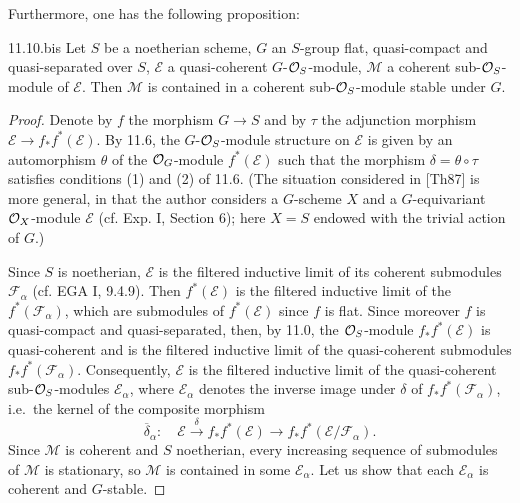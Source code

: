 Furthermore, one has the following proposition:
\begin{proposition}{11.10.bis}\label{VIB.11.10.bis}
Let $S$ be a noetherian scheme, $G$ an $S$-group flat, quasi-compact and quasi-separated over $S$, $\mathscr E$ a quasi-coherent $G$-$\mathcal{O}_S$-module, $\mathscr M$ a coherent sub-$\mathcal{O}_S$-module of $\mathscr E$. Then $\mathscr M$ is contained in a coherent sub-$\mathcal{O}_S$-module stable under $G$.
\end{proposition}
\begin{proof}
Denote by $f$ the morphism $G\to S$ and by $\tau$ the adjunction morphism $\mathscr E\to f_*f^*(\mathscr E)$. By 11.6, the $G$-$\mathcal{O}_S$-module structure on $\mathscr E$ is given by an automorphism $\theta$ of the $\mathcal{O}_G$-module $f^*(\mathscr E)$ such that the morphism $\delta=\theta\circ\tau$ satisfies conditions (1) and (2) of 11.6. (The situation considered in [Th87] is more general, in that the author considers a $G$-scheme $X$ and a $G$-equivariant $\mathcal{O}_X$-module $\mathscr E$ (cf. Exp. I, Section 6); here $X=S$ endowed with the trivial action of $G$.)

Since $S$ is noetherian, $\mathscr E$ is the filtered inductive limit of its coherent submodules $\mathscr F_\alpha$ (cf. EGA I, 9.4.9). Then $f^*(\mathscr E)$ is the filtered inductive limit of the $f^*(\mathscr F_\alpha)$, which are submodules of $f^*(\mathscr E)$ since $f$ is flat. Since moreover $f$ is quasi-compact and quasi-separated, then, by 11.0, the $\mathcal{O}_S$-module $f_*f^*(\mathscr E)$ is quasi-coherent and is the filtered inductive limit of the quasi-coherent submodules $f_*f^*(\mathscr F_\alpha)$. Consequently, $\mathscr E$ is the filtered inductive limit of the quasi-coherent sub-$\mathcal{O}_S$-modules $\mathscr E_\alpha$, where $\mathscr E_\alpha$ denotes the inverse image under $\delta$ of $f_*f^*(\mathscr F_\alpha)$, i.e.\ the kernel of the composite morphism
\[
\overline\delta_\alpha:\quad\mathscr E\xrightarrow{\delta}f_*f^*(\mathscr E)\to f_*f^*(\mathscr E/\mathscr F_\alpha).
\]
Since $\mathscr M$ is coherent and $S$ noetherian, every increasing sequence of submodules of $\mathscr M$ is stationary, so $\mathscr M$ is contained in some $\mathscr E_\alpha$. Let us show that each $\mathscr E_\alpha$ is coherent and $G$-stable.


\end{proof}

